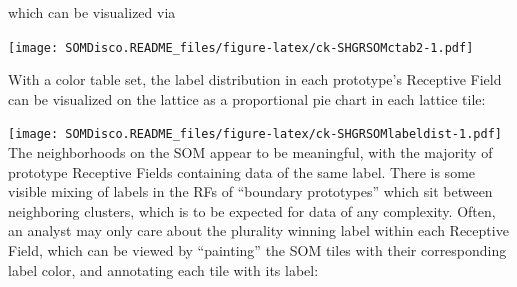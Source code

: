 \documentclass[]{article}
\newenvironment{Shaded}{\begin{snugshade}}{\end{snugshade}}
\newcommand{\CommentTok}[1]{\textcolor[rgb]{0.56,0.35,0.01}{\textit{#1}}}
\newcommand{\DataTypeTok}[1]{\textcolor[rgb]{0.13,0.29,0.53}{#1}}
\newcommand{\KeywordTok}[1]{\textcolor[rgb]{0.13,0.29,0.53}{\textbf{#1}}}
\newcommand{\NormalTok}[1]{#1}
\newcommand{\OperatorTok}[1]{\textcolor[rgb]{0.81,0.36,0.00}{\textbf{#1}}}
\begin{document}
which can be visualized via

\begin{Shaded}
\end{Shaded}

\texttt{[image: SOMDisco.README\_files/figure-latex/ck-SHGRSOMctab2-1.pdf]}

With a color table set, the label distribution in each prototype's Receptive Field can be visualized on the lattice as a proportional pie chart in each lattice tile:

\begin{Shaded}
\end{Shaded}

\texttt{[image: SOMDisco.README\_files/figure-latex/ck-SHGRSOMlabeldist-1.pdf]}
The neighborhoods on the SOM appear to be meaningful, with the majority of prototype Receptive Fields containing data of the same label. There is some visible mixing of labels in the RFs of ``boundary prototypes'' which sit between neighboring clusters, which is to be expected for data of any complexity. Often, an analyst may only care about the plurality winning label within each Receptive Field, which can be viewed by ``painting'' the SOM tiles with their corresponding label color, and annotating each tile with its label:

\begin{Shaded}
\end{Shaded}
\end{document}
